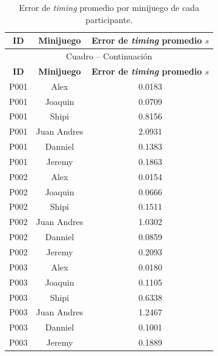 \begin{longtable}{|c|c|c|}

    \caption{Error de \textit{timing} promedio por minijuego de cada participante.}
    \label{tab:timingPromedio}\\
    \hline

    \textbf{ID} &
    \textbf{Minijuego} &
    \textbf{Error de \textit{timing} promedio \(s\)} \\ \hline

    \endfirsthead

    \multicolumn{3}{c}{
        Cuadro \thetable{} -- Continuación
    } \\
    \hline

    \textbf{ID} &
    \textbf{Minijuego} &
    \textbf{Error de \textit{timing} promedio \(s\)} \\ \hline

    \endhead

    P001 & Alex        & 0.0183 \\ \hline
    P001 & Joaquin     & 0.0709 \\ \hline
    P001 & Shipi       & 0.8156 \\ \hline
    P001 & Juan Andres & 2.0931 \\ \hline
    P001 & Danniel     & 0.1383 \\ \hline
    P001 & Jeremy      & 0.1863 \\ \hline

    P002 & Alex        & 0.0154 \\ \hline
    P002 & Joaquin     & 0.0666 \\ \hline
    P002 & Shipi       & 0.1511 \\ \hline
    P002 & Juan Andres & 1.0302 \\ \hline
    P002 & Danniel     & 0.0859 \\ \hline
    P002 & Jeremy      & 0.2093 \\ \hline

    P003 & Alex        & 0.0180 \\ \hline
    P003 & Joaquin     & 0.1105 \\ \hline
    P003 & Shipi       & 0.6338 \\ \hline
    P003 & Juan Andres & 1.2467 \\ \hline
    P003 & Danniel     & 0.1001 \\ \hline
    P003 & Jeremy      & 0.1889 \\ \hline


\end{longtable}
